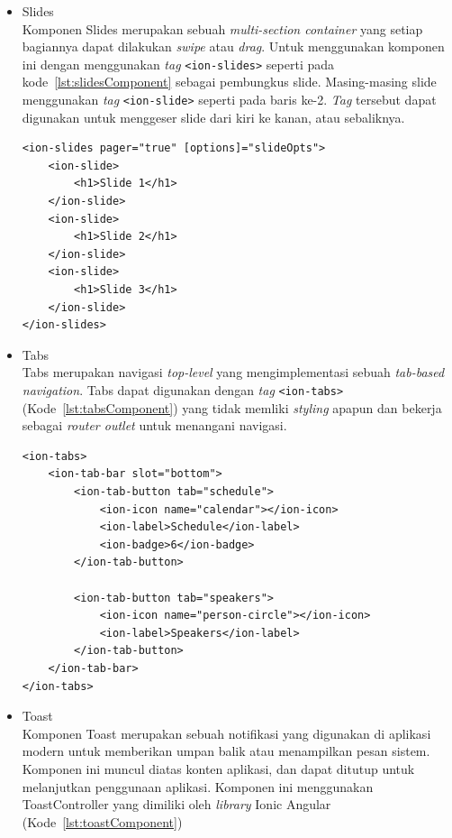 \begin{itemize}
	\item Slides \\
	Komponen Slides merupakan sebuah \textit{multi-section container} yang setiap bagiannya dapat dilakukan \textit{swipe} atau \textit{drag}. Untuk menggunakan komponen ini dengan menggunakan \textit{tag} \texttt{<ion-slides>} seperti pada kode~\ref{lst:slidesComponent} sebagai pembungkus slide. Masing-masing slide menggunakan \textit{tag} \texttt{<ion-slide>} seperti pada baris ke-2. \textit{Tag} tersebut dapat digunakan untuk menggeser slide dari kiri ke kanan, atau sebaliknya.

\newpage	
	
\begin{lstlisting}[label={lst:slidesComponent}, caption=Kode Program dari Slides]
<ion-slides pager="true" [options]="slideOpts">
	<ion-slide>
		<h1>Slide 1</h1>
	</ion-slide>
	<ion-slide>
		<h1>Slide 2</h1>
	</ion-slide>
	<ion-slide>
		<h1>Slide 3</h1>
	</ion-slide>
</ion-slides>
\end{lstlisting}
	
	\item Tabs \\
	Tabs merupakan navigasi {\it top-level} yang mengimplementasi sebuah {\it tab-based navigation}. Tabs dapat digunakan dengan {\it tag} \texttt{<ion-tabs>} (Kode~\ref{lst:tabsComponent}) yang tidak memliki {\it styling} apapun dan bekerja sebagai {\it router outlet} untuk menangani navigasi. 
\begin{lstlisting}[label={lst:tabsComponent}, caption=Kode Program dari Tabs]
<ion-tabs>
	<ion-tab-bar slot="bottom">
		<ion-tab-button tab="schedule">
			<ion-icon name="calendar"></ion-icon>
			<ion-label>Schedule</ion-label>
			<ion-badge>6</ion-badge>
		</ion-tab-button>

		<ion-tab-button tab="speakers">
			<ion-icon name="person-circle"></ion-icon>
			<ion-label>Speakers</ion-label>
		</ion-tab-button>
	</ion-tab-bar>
</ion-tabs>
\end{lstlisting}
		
	\item Toast \\
	Komponen Toast merupakan sebuah notifikasi yang digunakan di aplikasi modern untuk memberikan umpan balik atau menampilkan pesan sistem. Komponen ini muncul diatas konten aplikasi, dan dapat ditutup untuk melanjutkan penggunaan aplikasi. Komponen ini menggunakan ToastController yang dimiliki oleh \textit{library} Ionic Angular (Kode~\ref{lst:toastComponent}) 


\end{itemize}
